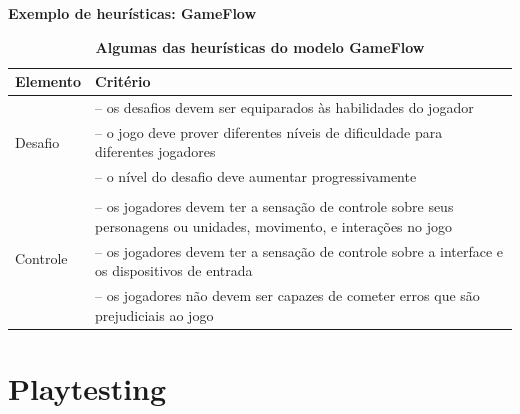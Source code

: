 \expandafter\documentclass\expandafter[table, usenames, svgnames, dvipsnames, \classopts]{beamer}
\begin{document}
\begin{frame}{\textbf{Exemplo de heurísticas: GameFlow}}

	\begin{table}
		\scriptsize
		\setlength{\tabcolsep}{1pt}
		\renewcommand{\arraystretch}{1.5}
		\caption{\textbf{Algumas das heurísticas do modelo GameFlow} \cite{Sweetser2005}}

		\begin{tabular}{p{}p{}}

			\toprule
			\textbf{Elemento} & \textbf{Critério}\\
			\midrule
			\multirow{3}{*}{Desafio}  & -- os desafios devem ser equiparados às habilidades do jogador\\
									  & -- o jogo deve prover diferentes níveis de dificuldade para diferentes jogadores\\
									  & -- o nível do desafio deve aumentar progressivamente\\[1em]
			\midrule

			\multirow{4}{*}{Controle} & \\ & -- os jogadores devem ter a sensação de controle sobre seus personagens ou unidades, movimento, e interações no jogo\\
									  & -- os jogadores devem ter a sensação de controle sobre a interface e os dispositivos de entrada\\
									  & -- os jogadores não devem ser capazes de cometer erros que são prejudiciais ao jogo\\
			\bottomrule
		
		\end{tabular}

	\end{table}

\end{frame}

\section{Playtesting}
\end{document}
